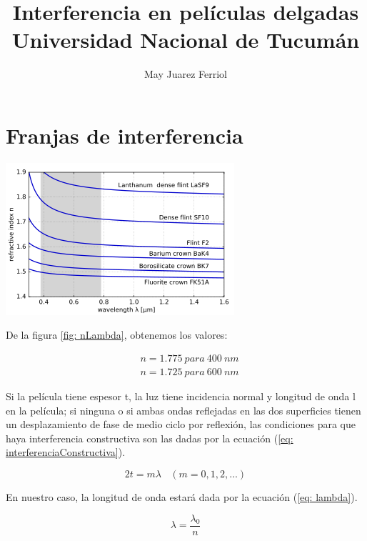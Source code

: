 \documentclass[a4paper,12pt]{article}
\title{ Interferencia en películas delgadas \\ 
\medskip \large Universidad Nacional de Tucumán}
\author{May Juarez Ferriol}
\date{}
\newenvironment{Figure}
  {\par\medskip\noindent\minipage{\linewidth}}
  {\endminipage\par\medskip}
\begin{document}
\maketitle

\section*{Franjas de interferencia}

    \begin{Figure}
        \centering

        \includegraphics[width=0.5\linewidth]{flint.png}
        \label{fig: nLambda}
    \end{Figure}

    De la figura \ref{fig: nLambda}, obtenemos los valores:

    \begin{align*}
        &n = 1.775 \ para \ 400 \ nm\\
        &n = 1.725 \ para \ 600 \ nm
    \end{align*}

    Si la película tiene espesor t, la luz tiene incidencia normal y longitud de onda l en la película; si ninguna o si ambas ondas reflejadas en las dos superficies tienen un desplazamiento de fase de medio ciclo por reflexión, las condiciones para que haya interferencia constructiva son las dadas por la ecuación (\ref{eq: interferenciaConstructiva}). \cite{Sears}

    \begin{equation}
        2t=m \lambda \ \ \ \ (m=0, 1, 2, ...)
        \label{eq: interferenciaConstructiva}
    \end{equation}

    En nuestro caso, la longitud de onda estará dada por la ecuación (\ref{eq: lambda}). \cite{Sears}

    \begin{equation}
        \lambda = \frac{\lambda_0}{n}
        \label{eq: lambda}
    \end{equation}
\end{document}
